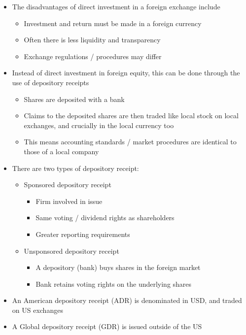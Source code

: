 \documentclass[../notes_compiled.tex]{subfiles}
\begin{document}
\begin{itemize}
\item The disadvantages of direct investment in a foreign exchange include
\begin{itemize}
\item Investment and return must be made in a foreign currency
\item Often there is less liquidity and transparency
\item Exchange regulations / procedures may differ
\end{itemize}

\item Instead of direct investment in foreign equity, this can be done through the use of depository receipts
\begin{itemize}
\item Shares are deposited with a bank
\item Claims to the deposited shares are then traded like local stock on local exchanges, and crucially in the local currency too
\item This means accounting standards / market procedures are identical to those of a local company

\end{itemize}

\item There are two types of depository receipt:
\begin{itemize}
\item Sponsored depository receipt
\begin{itemize}
\item Firm involved in issue
\item Same voting / dividend rights as shareholders
\item Greater reporting requirements
\end{itemize}
\item Unsponsored depository receipt
\begin{itemize}
\item A depository (bank) buys shares in the foreign market
\item Bank retains voting rights on the underlying shares
\end{itemize}
\end{itemize}

\item An American depository receipt (ADR) is denominated in USD, and traded on US exchanges
\item A Global depository receipt (GDR) is issued outside of the US

\end{itemize}
\end{document}
